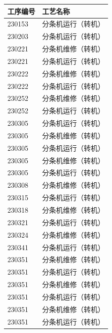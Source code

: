 \documentclass[UTF8,10pt,a4paper,fontset=fandol]{ctexart}
\begin{document}
{\begin{minipage}{24.8cm}
\begin{minipage}[t]{11.8cm}
\begin{tabular}{|p{2.1cm}|p{8.8cm}|}
\hline
工序编号 & 工艺名称\\
\hline
230153 & 分条机运行（转机）\\
\hline
230203 & 分条机运行（转机）\\
\hline
230221 & 分条机维修（转机）\\
\hline
230221 & 分条机运行（转机）\\
\hline
230222 & 分条机维修（转机）\\
\hline
230222 & 分条机运行（转机）\\
\hline
230252 & 分条机维修（转机）\\
\hline
230252 & 分条机运行（转机）\\
\hline
230305 & 分条机运行（转机）\\
\hline
230305 & 分条机维修（转机）\\
\hline
230305 & 分条机运行（转机）\\
\hline
230305 & 分条机维修（转机）\\
\hline
230305 & 分条机运行（转机）\\
\hline
230308 & 分条机维修（转机）\\
\hline
230315 & 分条机运行（转机）\\
\hline
230318 & 分条机维修（转机）\\
\hline
230321 & 分条机运行（转机）\\
\hline
230324 & 分条机维修（转机）\\
\hline
230341 & 分条机运行（转机）\\
\hline
230351 & 分条机维修（转机）\\
\hline
230351 & 分条机运行（转机）\\
\hline
230351 & 分条机维修（转机）\\
\hline
230351 & 分条机运行（转机）\\
\hline
230351 & 分条机维修（转机）\\
\hline
230351 & 分条机运行（转机）\\
\hline
\end{tabular}
\end{minipage}

\end{minipage}%
}

\end{document}

